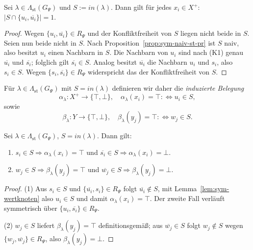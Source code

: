 \begin{Lemma}[Wertknoten]
    \label{lem:sym-wertknoten}
    Sei \(\lambda\in\Lambda_{\mathrm{st}}(G_\Psi)\) und
    \(S:=\mathit{in}(\lambda)\). Dann gilt für jedes \(x_i\in X^{+}\):
    \(|S\cap\{u_i,\overline{u_i}\}|=1\).
\end{Lemma}

\begin{proof}
    Wegen \(\{u_i,\overline{u_i}\}\in R_\Psi\) und der Konfliktfreiheit von
    \(S\) liegen nicht beide in \(S\). Seien nun beide nicht in \(S\). Nach
    Proposition~\ref{prop:sym-naiv-st-pr} ist \(S\) naiv, also besitzt
    \(u_i\) einen Nachbarn in \(S\). Die Nachbarn von \(u_i\) sind nach (K1)
    genau \(\overline{u_i}\) und \(\overline{s_i}\); folglich gilt
    \(\overline{s_i}\in S\). Analog besitzt \(\overline{u_i}\) die Nachbarn
    \(u_i\) und \(s_i\), also \(s_i\in S\). Wegen
    \(\{s_i,\overline{s_i}\}\in R_\Psi\) widerspricht das der
    Konfliktfreiheit von \(S\).
\end{proof}

Für \(\lambda\in\Lambda_{\mathrm{st}}(G_\Psi)\) mit
\(S=\mathit{in}(\lambda)\) definieren wir daher die \emph{induzierte Belegung}
\[
    \alpha_\lambda:X^{+}\to\{\top,\bot\},\quad
    \alpha_\lambda(x_i)=\top:\iff u_i\in S,
\]
sowie
\[
    \beta_\lambda:Y\to\{\top,\bot\},\quad
    \beta_\lambda(y_j)=\top:\iff w_j\in S.
\]

\begin{Lemma}[Signaltreue]
    \label{lem:sym-signaltreue}
    Sei \(\lambda\in\Lambda_{\mathrm{st}}(G_\Psi)\), \(S=\mathit{in}(\lambda)\).
    Dann gilt:
    \begin{enumerate}
        \item \(s_i\in S\Rightarrow\alpha_\lambda(x_i)=\top\) und
        \(\overline{s_i}\in S\Rightarrow\alpha_\lambda(x_i)=\bot\).
        \item \(w_j\in S\Rightarrow\beta_\lambda(y_j)=\top\) und
        \(\overline{w_j}\in S\Rightarrow\beta_\lambda(y_j)=\bot\).
    \end{enumerate}
\end{Lemma}

\begin{proof}
    (1) Aus \(s_i\in S\) und \(\{\overline{u_i},s_i\}\in R_\Psi\) folgt
    \(\overline{u_i}\notin S\), mit Lemma~\ref{lem:sym-wertknoten} also
    \(u_i\in S\) und damit \(\alpha_\lambda(x_i)=\top\). Der zweite Fall
    verläuft symmetrisch über \(\{u_i,\overline{s_i}\}\in R_\Psi\).

    (2) \(w_j\in S\) liefert \(\beta_\lambda(y_j)=\top\) definitionsgemäß; aus
    \(\overline{w_j}\in S\) folgt \(w_j\notin S\) wegen
    \(\{w_j,\overline{w_j}\}\in R_\Psi\), also \(\beta_\lambda(y_j)=\bot\).
\end{proof}

